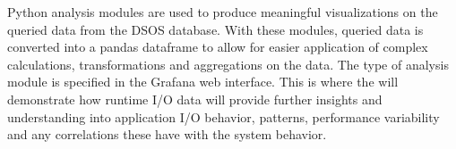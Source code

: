 Python analysis modules are used to produce meaningful visualizations on the queried data from the DSOS database. With these modules, queried data is converted into a pandas dataframe to allow for easier application of complex calculations, transformations and aggregations on the data. The type of analysis module is specified in the Grafana web interface. This is where the \Darshan{} will demonstrate how runtime I/O data will provide further insights and understanding into application I/O behavior, patterns, performance variability and any correlations these have with the system behavior.   

